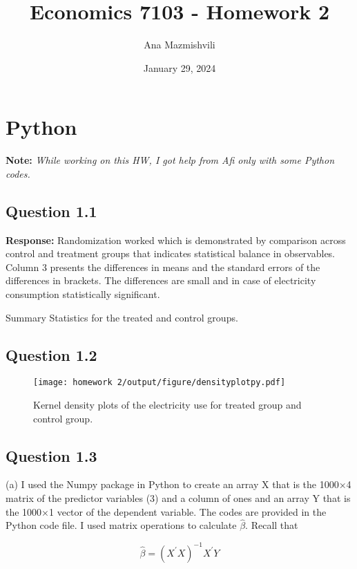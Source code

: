 \documentclass{article}
\title{Economics 7103 - Homework 2}
\author{Ana Mazmishvili}
\date{ January 29, 2024 }
\begin{document}
  
\maketitle 

\section*{Python}
\textbf{Note:} \textit{ While working on this HW, I got help from Afi only with some Python codes.}

\subsection*{Question 1.1}
\textbf{Response:} Randomization worked which is demonstrated by comparison across control and treatment groups that indicates statistical balance in observables. Column 3 presents the differences in means and the standard errors of the differences in brackets. The differences are small and in case of electricity consumption statistically significant.

\begin{table}[hbt!]
    \centering
    
    \caption{Summary Statistics for the treated and control groups.}
    \label{tab:my_label}
\end{table}


\subsection*{Question 1.2}

\begin{figure}[hbt!]
    \centering
    \texttt{[image: homework 2/output/figure/densityplotpy.pdf]}
    \caption{Kernel density plots of the electricity use for treated group and control group.}
    \label{fig:hist}
\end{figure}


\FloatBarrier
\subsection*{Question 1.3}
(a) I used the Numpy package in Python to create an array X that is the 1000×4 matrix of the predictor variables (3) and a column of ones and an array Y that is the 1000×1 vector
of the dependent variable. The codes are provided in the Python code file. I used matrix operations to calculate \(\hat{\beta}\). Recall that 

\[\hat{\beta} = (X^{'}X)^{-1}X^{'}Y \]
\end{document}
